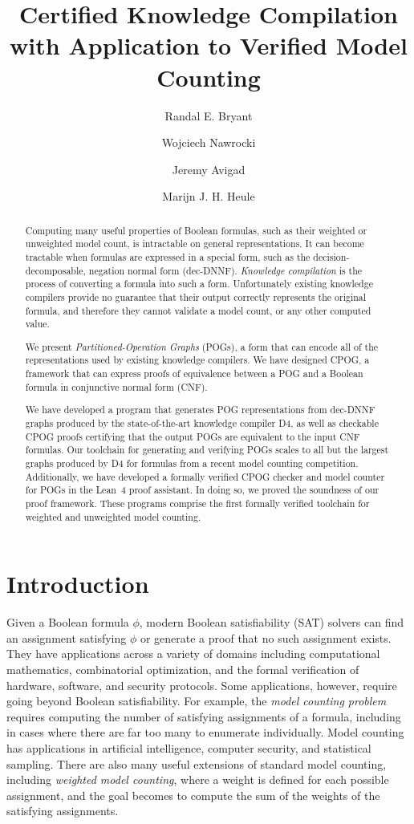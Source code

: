\documentclass[letterpaper,USenglish,cleveref, autoref, thm-restate]{lipics-v2021}
\title{Certified Knowledge Compilation \\ with Application to Verified Model Counting}
\author{Randal E. Bryant}{Computer Science Department, Carnegie Mellon University, Pittsburgh, PA 15213 USA}{Randy.Bryant@cs.cmu.edu}{https://orcid.org/0000-0001-5024-6613}{Supported by NSF grant CCF-2108521}
\author{Wojciech Nawrocki}{Department of Philosophy, Carnegie Mellon University}{wjnawrocki@cmu.edu}{https://orcid.org/0000-0002-8839-0618}{Hoskinson Center for Formal Mathematics}
\author{Jeremy Avigad}{Department of Philosophy, Carnegie Mellon University}{avigad@cmu.edu}{https://orcid.org/0000-0003-1275-315X}{Hoskinson Center for Formal Mathematics}
\author{Marijn J. H. Heule}{Computer Science Department, Carnegie Mellon University}{marijn@cmu.edu}{https://orcid.org/0000-0002-5587-8801}{Supported by NSF grant CCF-2108521}
\newcommand{\progname}[1]{\textsc{#1}}
\newcommand{\dfour}{\progname{D4}}
\newcommand{\lean}{Lean~4}
\begin{document}
\maketitle

\begin{abstract}

Computing many useful properties of Boolean formulas, such as their weighted or unweighted model count,
is intractable on general representations. It can become tractable when formulas are expressed in a
special form, such as the decision-decomposable, negation normal form (dec-DNNF)\@.
\emph{Knowledge compilation} is the process of converting a formula
into such a form. Unfortunately existing knowledge compilers provide no guarantee that their output correctly
represents the original formula, and therefore they cannot validate a model count, or any other computed value.

We present \emph{Partitioned-Operation Graphs} (POGs), a form that can
encode all
of the representations used by existing knowledge compilers.
We have designed  CPOG, a framework that can express proofs of equivalence between a
POG  and a Boolean formula in conjunctive normal form (CNF).

We have developed a program that generates POG representations from dec-DNNF
graphs
produced by the state-of-the-art knowledge compiler
\dfour{}, as well as checkable CPOG proofs certifying that the output POGs
are equivalent to the input CNF formulas.  Our toolchain
for generating and verifying POGs scales to all but the largest
graphs produced by \dfour{} for formulas from a recent model counting
competition. Additionally, we have developed a formally verified CPOG
checker and model counter for POGs in the \lean{} proof assistant.
In doing so, we proved the soundness of our proof framework. These programs
comprise the first formally verified toolchain for weighted and unweighted
model counting.
\end{abstract}

\section{Introduction}

Given a Boolean formula $\phi$, modern Boolean satisfiability (SAT) solvers can
find an assignment satisfying $\phi$ or generate a proof that no
such assignment exists.  They have applications across a variety of
domains including computational mathematics, combinatorial
optimization, and the formal verification of hardware, software, and
security protocols.  Some applications, however, require going
beyond Boolean satisfiability.  For example, the \emph{model
  counting problem} requires computing the number of satisfying
assignments of a formula, including in cases where there are far too many
to enumerate individually.  Model counting has
applications in artificial intelligence, computer security, and
statistical sampling.  There are also many useful extensions of standard model counting,
including {\em
  weighted model counting}, where a weight is defined for
each possible assignment, and the goal becomes to compute the sum of the weights
of the satisfying assignments.
\end{document}
